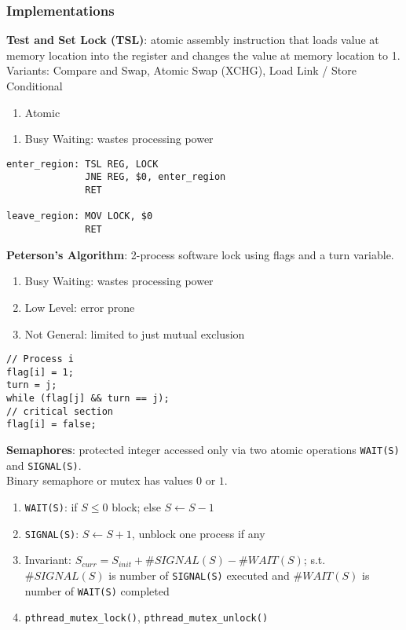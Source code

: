 \documentclass[12pt, a4paper]{article}
\begin{document}
\begin{multicols*}{3}
\subsubsection{Implementations} \textbf{Test and Set Lock (TSL)}: atomic assembly instruction that loads value at memory location into the register and changes the value at memory location to 1.\\Variants: Compare and Swap, Atomic Swap (XCHG), Load Link / Store Conditional 
\begin{enumerate}[$+$]
  \item Atomic 
\end{enumerate}\vspace{-1pt}
\begin{enumerate}[$-$]
  \item Busy Waiting: wastes processing power
\end{enumerate}
\vspace{2pt}
\begin{lstlisting}
enter_region: TSL REG, LOCK 
              JNE REG, $0, enter_region 
              RET 

leave_region: MOV LOCK, $0 
              RET
\end{lstlisting}

\colbreak

\textbf{Peterson's Algorithm}: 2-process software lock using flags and a turn variable.
\begin{enumerate}[$-$]
  \item Busy Waiting: wastes processing power
  \item Low Level: error prone
  \item Not General: limited to just mutual exclusion 
\end{enumerate}
\begin{lstlisting}
// Process i
flag[i] = 1;
turn = j;
while (flag[j] && turn == j);
// critical section
flag[i] = false;
\end{lstlisting}

\textbf{Semaphores}: protected integer accessed only via two atomic operations \lstinline|WAIT(S)| and \lstinline|SIGNAL(S)|.\\Binary semaphore or mutex has values $0$ or $1$.
\begin{enumerate}[\roman*.]
  \item \lstinline|WAIT(S)|: if $S \leq 0$ block; else $S \leftarrow S-1$
  \item \lstinline|SIGNAL(S)|: $S \leftarrow S+1$, unblock one process if any
  \item Invariant: $S_{curr} = S_{init} + \#SIGNAL(S) - \#WAIT(S)$; s.t. $\#SIGNAL(S)$ is number of \lstinline|SIGNAL(S)| executed and $\#WAIT(S)$ is number of \lstinline|WAIT(S)| completed
  \item \lstinline|pthread_mutex_lock()|, \lstinline|pthread_mutex_unlock()|
\end{enumerate}


\end{multicols*}
\end{document}
